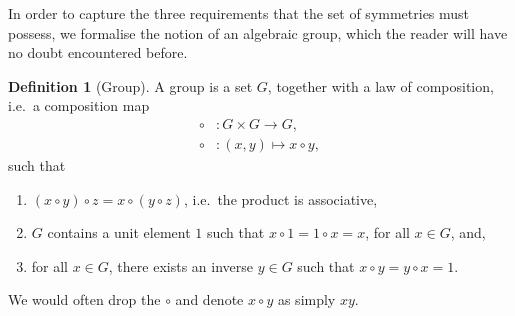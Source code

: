 \documentclass[a4 paper, 12pt, oneside]{book}
\theoremstyle{definition}
\newtheorem{definition}[theorem]{Definition}
\begin{document}
	In order to capture the three requirements that the set of symmetries must possess, we formalise the notion of an algebraic group, which the reader will have no doubt encountered before.
	\begin{definition}[Group]
		A group is a set \(G\), together with a law of composition, i.e.\ a composition map
		\begin{align*}
			\circ &\colon G \times G \rightarrow G,\\
			\circ &\colon (x, y) \mapsto x \circ y,
		\end{align*}
		such that
		\begin{enumerate}
			\item \((x\circ y) \circ z = x\circ (y \circ z)\), i.e.\ the product is associative,
			\item \(G\) contains a unit element \(1\) such that \(x \circ 1 = 1 \circ x = x\), for all \(x \in G\), and,
			\item for all \(x\in G\), there exists an inverse \(y \in G\) such that \(x \circ y = y \circ x = 1\).
		\end{enumerate}
	\end{definition}
	\noindent We would often drop the \(\circ\) and denote \(x\circ y\) as simply \(xy\).
\end{document}
